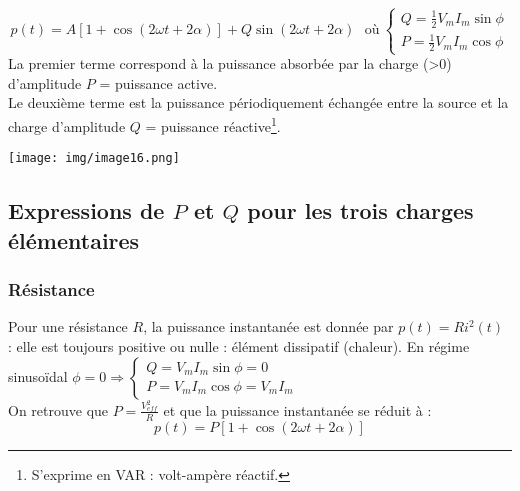 \documentclass	[11pt, a4paper, openany]{book}
\begin{document}
		      \begin{equation}
		      	p(t) = A[1 + \cos(2\omega t + 2\alpha)] + Q \sin(2\omega t + 2\alpha)\ \ \ \text{où}\ \left\{\begin{array}{l}
		      	Q = \frac{1}{2}V_mI_m\sin\phi\\
		      	P = \frac{1}{2}V_mI_m\cos\phi
		      	\end{array}\right.
		      \end{equation}
		      La premier terme correspond à la puissance absorbée par la charge (>0) d'amplitude $P$ = puissance active.\\
		      Le deuxième terme est la puissance périodiquement échangée entre la source et la charge d'amplitude $Q$ = puissance réactive\footnote{S'exprime en VAR : volt-ampère réactif.}.
		      \begin{center}
		      	\texttt{[image: img/image16.png]}
		      \end{center}
		      
		      \setcounter{subsection}{3}
		      \subsection{Expressions de $P$ et $Q$ pour les trois charges élémentaires}
		      \subsubsection{Résistance}
		      Pour une résistance $R$, la puissance instantanée est donnée par $p(t) = Ri^2(t)$ : elle est toujours positive ou nulle : élément dissipatif (chaleur).
		      En régime sinusoïdal $\phi = 0 \Rightarrow  \left\{\begin{array}{l}
		      Q = V_mI_m\sin\phi = 0\\
		      P = V_mI_m\cos\phi = V_mI_m
		\end{array}\right.$\\
		On retrouve que $P = \frac{V_{eff}^2}{R}$ et que la puissance instantanée se réduit à :
		\begin{equation}
			p(t) = P[1 + \cos(2\omega t + 2\alpha)]
		\end{equation}
		
\end{document}
